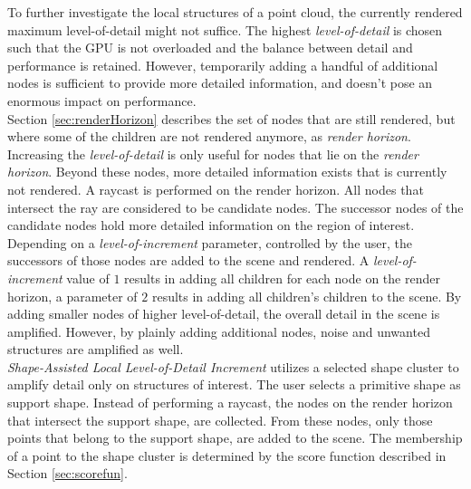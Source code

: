 To further investigate the local structures of a point cloud, the currently rendered maximum level-of-detail might not suffice. The highest \textit{level-of-detail} is chosen such that the GPU is not overloaded and the balance between detail and performance is retained. However, temporarily adding a handful of additional nodes is sufficient to provide more detailed information, and doesn't pose an enormous impact on performance.
\\

Section \ref{sec:renderHorizon} describes the set of nodes that are still rendered, but where some of the children are not rendered anymore, as \textit{render horizon}. 
Increasing the \textit{level-of-detail} is only useful for nodes that lie on the \textit{render horizon}. Beyond these nodes, more detailed information exists that is currently not rendered. A raycast is performed on the render horizon. All nodes that intersect the ray are considered to be candidate nodes. The successor nodes of the candidate nodes hold more detailed information on the region of interest. Depending on a \textit{level-of-increment} parameter, controlled by the user, the successors of those nodes are added to the scene and rendered. A \textit{level-of-increment} value of $1$ results in adding all children for each node on the render horizon, a parameter of $2$ results in adding all children's children to the scene. 
By adding smaller nodes of higher level-of-detail, the overall detail in the scene is amplified. However, by plainly adding additional nodes, noise and unwanted structures are amplified as well. 
\\

\textit{Shape-Assisted Local Level-of-Detail Increment} utilizes a selected shape cluster to amplify detail only on structures of interest. The user selects a primitive shape as support shape. Instead of performing a raycast, the nodes on the render horizon that intersect the support shape, are collected. From these nodes, only those points that belong to the support shape, are added to the scene. The membership of a point to the shape cluster is determined by the score function described in Section \ref{sec:scorefun}. 


